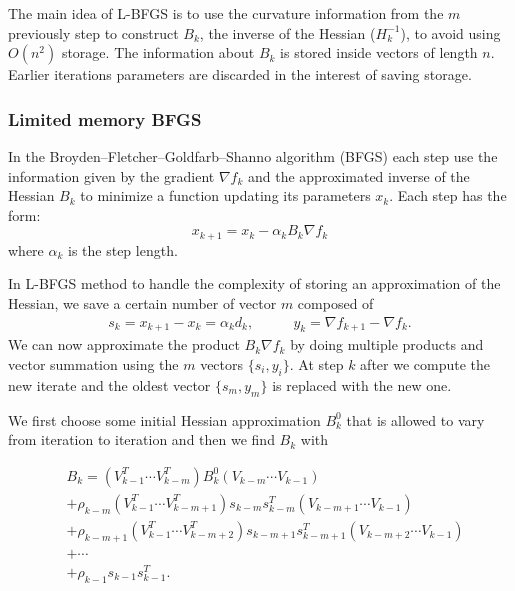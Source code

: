 The main idea of L-BFGS is to use the curvature information from the $m$ previously step to construct $B_{k}$, the inverse of the Hessian ($H_{k}^{-1}$), to avoid using $O(n^2)$ storage. The information about $B_{k}$ is stored inside vectors of length $n$. Earlier iterations parameters are discarded in the interest of saving storage.

\subsubsection{Limited memory BFGS}
\label{L-BFGS}
In the Broyden–Fletcher–Goldfarb–Shanno algorithm (BFGS) each step use the information given by the gradient $\nabla f_{k}$ and the approximated inverse of the Hessian $B_{k}$ to minimize  a function updating its parameters $x_{k}$. Each step has the form: 
\begin{equation}
\label{direction}
x_{k+1} = x_{k} - \alpha_{k}B_{k}\nabla f_{k}
\end{equation} 
where $\alpha_{k}$ is the step length.

In L-BFGS method to handle the complexity of storing an approximation of the Hessian, we save a certain number of vector $m$ composed of 
\begin{align}
s_{k}=x_{k+1}-x_{k}=\alpha_{k}d_{k}, & \qquad
y_{k}=\nabla f_{k+1} - \nabla f_{k}.
\end{align}
We can now approximate the product $B_{k}\nabla f_{k}$ by doing multiple products and vector summation using the $m$ vectors $\{s_{i},y_{i}\}$. At step $k$ after we compute the new iterate and the oldest vector $\{s_{m},y_{m}\}$ is replaced with the new one.

We first choose some initial Hessian approximation $B^0_{k}$ that is allowed to vary from iteration to iteration and then we find $B_{k}$ with

\begin{equation} 
\begin{aligned}
&B_{k}=(V^T_{k-1}\cdots V^T_{k-m})B^0_{k}(V_{k-m}\cdots V_{k-1})\\           
&+\rho_{k-m}(V^T_{k-1}\cdots V^T_{k-m+1})s_{k-m}s^T_{k-m}(V_{k-m+1}\cdots V_{k-1})\\
&+\rho_{k-m+1}(V^T_{k-1}\cdots V^T_{k-m+2})s_{k-m+1}s^T_{k-m+1}(V_{k-m+2}\cdots V_{k-1})\\
&+ \cdots \\
&+\rho_{k-1}s_{k-1}s^T_{k-1}.  
\end{aligned}
\end{equation}

